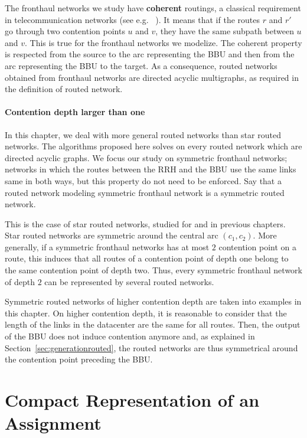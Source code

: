  
The fronthaul networks we study have \textbf{coherent} routings, a classical 
requirement in telecommunication networks (see e.g. ~\cite{Schwiebert1996ANA}). It means that
if the routes $r$ and $r'$ go through two contention points $u$ and $v$, they have the same subpath
between $u$ and $v$.
This is true for the fronthaul networks we modelize. The coherent property is respected from the source 
to the arc representing the BBU and then from the arc representing the BBU to the target.
 As a consequence, routed networks obtained from fronthaul networks are directed acyclic multigraphs, as required in the definition of routed network.


\paragraph*{Contention depth larger than one}

In this chapter, we deal with more general routed networks than star routed networks. The algorithms proposed here solves \spall on every routed network which are directed acyclic graphs. We focus our study on symmetric fronthaul networks; networks in which the routes between the RRH and the BBU use the same links same in both ways, but this property do not need to be enforced. Say that a routed network modeling symmetric fronthaul network is a symmetric routed network.

This is the case of star routed networks, studied for \pazl and \pall in previous chapters. Star routed networks are symmetric around the central arc $(c_1,c_2)$. More generally, if a symmetric fronthaul networks has at most $2$ contention point on a route, this induces that all routes of a contention point of depth one belong to the same contention point of depth two. Thus, every symmetric fronthaul network of depth $2$ can be represented by several routed networks.

Symmetric routed networks of higher contention depth are taken into examples in this chapter. On higher contention depth, it is reasonable to consider that the length of the links in the datacenter are the same for all routes. Then, the output of the BBU does not induce contention anymore and, as explained in Section~\ref{sec:generationrouted}, the routed networks are thus symmetrical around the contention point preceding the BBU. 

\section{Compact Representation of an Assignment}

